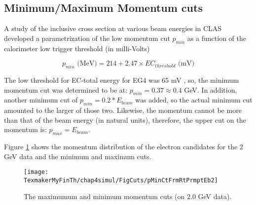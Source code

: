 \subsection{Minimum/Maximum Momentum cuts}
\label{pCuts}
A study \cite{cnKEgiyan} of the inclusive cross section at various beam energies in CLAS developed a parametrization of the low momentum cut $p_{min}$ as a function of the calorimeter low trigger %
threshold (in milli-Volts)%

\begin{equation}
\label{ecThres}
p_{min} \text{ (MeV)} = 214 + 2.47\times EC_{threshold} \text{ (mV)}
\end{equation}

The low threshold for EC-total energy for EG4 was 65 mV \cite{eg4Hm_wb}, so, %
the minimum momentum cut was determined to be at:  $p_{min} = 0.37 \approx 0.4$  GeV. In addition, %
another minimum cut of $p_{min}=0.2*E_{beam}$ was added, so the actual minimum cut amounted to the larger of those two. %
Likewise, the momentum cannot be more than that of the %
beam energy (in natural units), therefore, the upper %
cut on the momentum is: $p_{max}=E_{beam}$.

Figure \ref{pMnMxCt} shows the momentum distribution of the electron candidates for the 2 GeV data and the minimum and maximum cuts.


\begin{figure}[H]%
\centering
\leavevmode \texttt{[image: TexmakerMyFinTh/chap4simul/FigCuts/pMinCtFrmRtPrmptEb2]}  %
\caption[Maximum and minimum momentum cuts]{The maximumum and minimum momentum cuts (on 2.0 GeV  data).
}
\label{pMnMxCt}
\end{figure}
